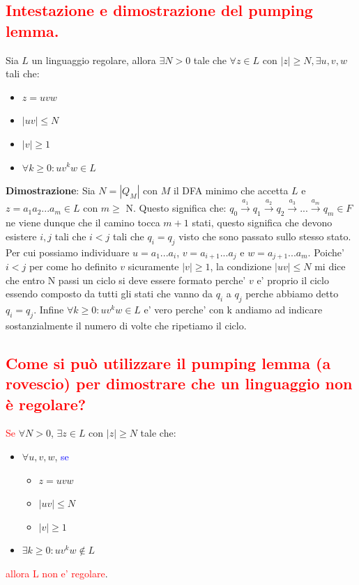 \documentclass{article}
\begin{document}
\subsection{\textcolor{red}{Intestazione e dimostrazione del pumping lemma.}}
Sia $L$ un linguaggio regolare, allora $\exists N > 0$ tale che $\forall z \in L$ con $|z| \geq N, \exists u,v,w$ tali che:
\begin{itemize}
    \item $z=uvw$
    \item $|uv| \leq N$
    \item $|v| \geq 1$
    \item $\forall k \geq 0 : uv^kw \in L$
\end{itemize}
\textbf{Dimostrazione}: Sia $N=|Q_M|$ con $M$ il DFA minimo che accetta $L$ e $z=a_1a_2...a_m \in L$ con $m \geq$ N.
Questo significa che: $q_0 \xrightarrow{a_1} q_1 \xrightarrow{a_2} q_2 \xrightarrow{a_3} ...  \xrightarrow{a_m} q_m \in F$ ne viene dunque che il camino tocca $m+1$ stati,
questo significa che devono esistere $i,j$ tali che $i < j$ tali che $q_i = q_j$ visto che sono passato sullo stesso stato.
Per cui possiamo individuare $u = a_1 ... a_i$, $v=a_{i+1}...a_j$ e $w=a_{j+1}...a_m$. Poiche' $i<j$ per come ho definito $v$ sicuramente $|v| \geq 1$,
la condizione $|uv| \leq N$ mi dice che entro N passi un ciclo si deve essere formato perche' $v$ e' proprio il ciclo essendo composto da tutti gli stati che vanno da
$q_i$ a $q_j$ perche abbiamo detto $q_i = q_j$. Infine $\forall k \geq 0 : uv^kw \in L$ e' vero perche' con k andiamo ad indicare sostanzialmente il numero di volte che
ripetiamo il ciclo.
\subsection{\textcolor{red}{Come si può utilizzare il pumping lemma (a rovescio) per dimostrare che un linguaggio non è regolare?}}
\textcolor{red}{Se} $\forall N > 0$, $\exists z \in L$ con $|z| \geq N$ tale che:
\begin{itemize}
    \item $\forall u,v,w$, \textcolor{blue}{se}
          \begin{itemize}
              \item $z=uvw$
              \item $|uv| \leq N$
              \item $|v| \geq 1$
          \end{itemize}
    \item $\exists k \geq 0 : uv^kw \not\in L$
\end{itemize}
\textcolor{red}{allora L non e' regolare}.
\end{document}
